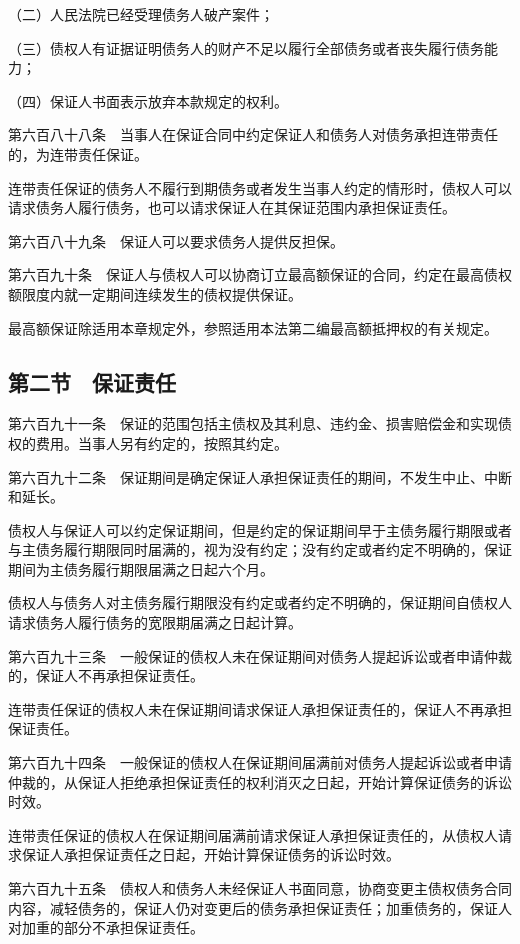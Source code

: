 \documentclass[UTF8,12pt,a4paper]{ctexbook}
\begin{document}
（二）人民法院已经受理债务人破产案件；

（三）债权人有证据证明债务人的财产不足以履行全部债务或者丧失履行债务能力；

（四）保证人书面表示放弃本款规定的权利。

第六百八十八条　当事人在保证合同中约定保证人和债务人对债务承担连带责任的，为连带责任保证。

连带责任保证的债务人不履行到期债务或者发生当事人约定的情形时，债权人可以请求债务人履行债务，也可以请求保证人在其保证范围内承担保证责任。

第六百八十九条　保证人可以要求债务人提供反担保。

第六百九十条　保证人与债权人可以协商订立最高额保证的合同，约定在最高债权额限度内就一定期间连续发生的债权提供保证。

最高额保证除适用本章规定外，参照适用本法第二编最高额抵押权的有关规定。

\subsection*{第二节　保证责任}

第六百九十一条　保证的范围包括主债权及其利息、违约金、损害赔偿金和实现债权的费用。当事人另有约定的，按照其约定。

第六百九十二条　保证期间是确定保证人承担保证责任的期间，不发生中止、中断和延长。

债权人与保证人可以约定保证期间，但是约定的保证期间早于主债务履行期限或者与主债务履行期限同时届满的，视为没有约定；没有约定或者约定不明确的，保证期间为主债务履行期限届满之日起六个月。

债权人与债务人对主债务履行期限没有约定或者约定不明确的，保证期间自债权人请求债务人履行债务的宽限期届满之日起计算。

第六百九十三条　一般保证的债权人未在保证期间对债务人提起诉讼或者申请仲裁的，保证人不再承担保证责任。

连带责任保证的债权人未在保证期间请求保证人承担保证责任的，保证人不再承担保证责任。

第六百九十四条　一般保证的债权人在保证期间届满前对债务人提起诉讼或者申请仲裁的，从保证人拒绝承担保证责任的权利消灭之日起，开始计算保证债务的诉讼时效。

连带责任保证的债权人在保证期间届满前请求保证人承担保证责任的，从债权人请求保证人承担保证责任之日起，开始计算保证债务的诉讼时效。

第六百九十五条　债权人和债务人未经保证人书面同意，协商变更主债权债务合同内容，减轻债务的，保证人仍对变更后的债务承担保证责任；加重债务的，保证人对加重的部分不承担保证责任。
\end{document}
